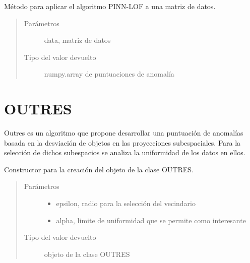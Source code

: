 \documentclass[letterpaper,10pt,spanish]{sphinxmanual}
\begin{document}

\begin{fulllineitems}
Método para aplicar el algoritmo PINN-LOF a una matriz de datos.
\begin{quote}\begin{description}
\item[{Parámetros}] \leavevmode
{} \textendash{} data, matriz de datos

\item[{Tipo del valor devuelto}] \leavevmode
numpy.array de puntuaciones de anomalía

\end{description}\end{quote}

\end{fulllineitems}



\chapter{OUTRES}
\label{\detokenize{index:outres}}
Outres es un algoritmo que propone desarrollar una puntuación de anomalías basada
en la desviación de objetos en las proyecciones subespaciales. Para la selección de
dichos subespacios se analiza la uniformidad de los datos en ellos.

\begin{fulllineitems}
\label{\detokenize{index:OUTRES}}
Constructor para la creación del objeto de la clase OUTRES.
\begin{quote}\begin{description}
\item[{Parámetros}] \leavevmode\begin{itemize}
\item {} 
 \textendash{} epsilon, radio para la selección del vecindario

\item {} 
 \textendash{} alpha, limite de uniformidad que se permite como interesante

\end{itemize}

\item[{Tipo del valor devuelto}] \leavevmode
objeto de la clase OUTRES

\end{description}\end{quote}

\end{fulllineitems}
\end{document}

